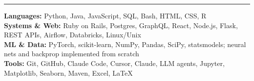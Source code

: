 \documentclass[letterpaper,10pt]{article}
\newcommand{\Section}[1]{\vspace{4pt}{\large\bfseries #1}\vspace{1pt}\hrule\vspace{3pt}}
\begin{document}
\Section{Technical Skills}
\textbf{Languages:} Python, Java, JavaScript, SQL, Bash, HTML, CSS, R \\
\textbf{Systems \& Web:} Ruby on Rails, Postgres, GraphQL, React, Node.js, Flask, REST APIs, Airflow, Databricks, Linux/Unix \\
\textbf{ML \& Data:} PyTorch, scikit-learn, NumPy, Pandas, SciPy, statsmodels; neural nets and backprop implemented from scratch \\
\textbf{Tools:} Git, GitHub, Claude Code, Cursor, Claude, LLM agents, Jupyter, Matplotlib, Seaborn, Maven, Excel, \LaTeX
\end{document}
